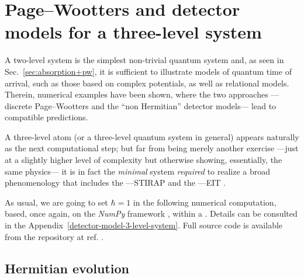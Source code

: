 \section{Page--Wootters and detector models for a three-level system}
\label{sec:pw3l}\label{sec:pw:apps_last}

A two-level system is the simplest non-trivial quantum system and,
as seen in Sec.~\ref{sec:absorption+pw},
it is sufficient to illustrate
models of quantum time of arrival,
such as those based on complex potentials,
as well as relational models.
Therein, numerical examples have been shown, where the two approaches
---discrete Page--Wootters and the ``non Hermitian'' detector models---
lead to
compatible predictions.

A three-level atom (or a three-level quantum system in general) appears
naturally
as
the next computational step;
but far from being merely another exercise
---just at a slightly higher level of complexity
but otherwise showing, essentially, the same physics---
it is in fact the \emph{minimal} system \emph{required}
to realize a broad
phenomenology that includes the
---STIRAP \parencite{Ruschhaupt_AtomDiode, NonHermitianShortcutSTIRAP, OptimizedTransferSTIRAP, Ruschhaupt_STA23}
and the
---EIT \parencite{EIT_Review}.


As usual, we are going to set $\hbar = 1$ in the following numerical computation,
based, once again, on the
\emph{NumPy} framework \parencite{comp:numpy},
within a
 \parencite{comp:jupyter}.
Details can be consulted in the Appendix~\ref{detector-model-3-level-system}.
Full source code is available from the repository at ref. \cite{OwnJupyterRepo}.

\subsection{Hermitian evolution}

